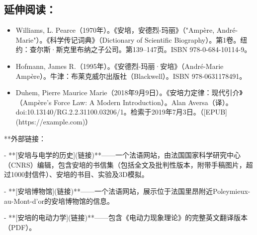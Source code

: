 \subsection{延伸阅读：}
\begin{itemize}
\item Williams, L. Pearce（1970年）。《安培，安德烈-玛丽》（"Ampère, André-Marie"）。《科学传记词典》（Dictionary of Scientific Biography）。第1卷。纽约：查尔斯·斯克里布纳之子公司。第139–147页。ISBN 978-0-684-10114-9。
\item Hofmann, James R.（1995年）。《安德烈-玛丽·安培》（André-Marie Ampère）。牛津：布莱克威尔出版社（Blackwell）。ISBN 978-0631178491。
\item Duhem, Pierre Maurice Marie（2018年9月9日）。《安培力定律：现代引介》（Ampère's Force Law: A Modern Introduction）。Alan Aversa（译）。doi:10.13140/RG.2.2.31100.03206/1。检索于2019年7月3日。（[EPUB](https://example.com)）
\end{itemize}
**外部链接：

- **[安培与电学的历史](链接)**——一个法语网站，由法国国家科学研究中心（CNRS）编辑，包含安培的书信集（包括全文及批判性版本，附带手稿图片，超过1000封信件）、安培的书目、实验及3D模拟。

- **[安培博物馆](链接)**——一个法语网站，展示位于法国里昂附近Poleymieux-au-Mont-d'or的安培博物馆的信息。

- **[安培的电动力学](链接)**——包含《电动力现象理论》的完整英文翻译版本（PDF）。